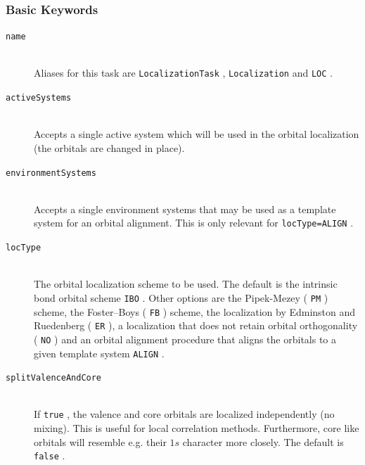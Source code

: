 \documentclass[bibliography=totocnumbered,a4paper,10pt,oneside]{scrbook}
\newcommand{\ttt}[1]{%
  \begingroup\setlength{\fboxsep}{1pt}%
  \colorbox{serenity-green!30}{\texttt{\hspace*{2pt}\vphantom{(g}#1\hspace*{2pt}}}%
  \endgroup
}
\begin{document}
\subsubsection{Basic Keywords}
\begin{description}
 \item [\texttt{name}]\hfill \\
   Aliases for this task are \ttt{LocalizationTask}, \ttt{Localization} and \ttt{LOC}.
 \item [\texttt{activeSystems}]\hfill \\
   Accepts a single active system which will be used in the orbital localization
   (the orbitals are changed in place).
 \item [\texttt{environmentSystems}]\hfill \\
   Accepts a single environment systems that may be used as a template system for an orbital alignment.
   This is only relevant for \ttt{locType=ALIGN}.
 \item [\texttt{locType}]\hfill \\
   The orbital localization scheme to be used. The default is the intrinsic bond orbital scheme \ttt{IBO}.
   Other options are the  Pipek-Mezey (\ttt{PM}) scheme, the Foster--Boys (\ttt{FB}) scheme, the localization
   by Edminston and Ruedenberg (\ttt{ER}), a localization that does not retain orbital orthogonality
   (\ttt{NO}) and an orbital alignment procedure that aligns the orbitals to a given template system \ttt{ALIGN}\cite{Bensberg2020}.
 \item [\texttt{splitValenceAndCore}]\hfill \\
   If \ttt{true}, the valence and core orbitals are localized independently (no mixing). This is useful
   for local correlation methods. Furthermore, core like orbitals will resemble e.g. their $1s$ character
   more closely. The default is \ttt{false}.
\end{description}
\end{document}
